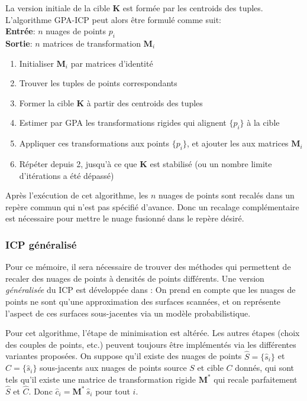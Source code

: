 \documentclass[a4paper,10pt]{scrreprt}
\begin{document}
La version initiale de la cible $\mathbf{K}$ est formée par les centroids des tuples. L'algorithme GPA-ICP peut alors être formulé comme suit: \cite{Told2010} \\
\textbf{Entrée}: $n$ nuages de points ${p_i}$ \\
\textbf{Sortie}: $n$ matrices de transformation ${\mathbf{M}_i}$
\begin{enumerate}
	\item Initialiser ${\mathbf{M}_i}$ par matrices d'identité
	\item Trouver les tuples de points correspondants
	\item Former la cible $\mathbf{K}$ à partir des centroids des tuples
	\item Estimer par GPA les transformations rigides qui alignent $\{p_i\}$ à la cible
	\item Appliquer ces transformations aux points $\{p_i\}$, et ajouter les aux matrices ${\mathbf{M}_i}$
	\item Répéter depuis 2, jusqu'à ce que $\mathbf{K}$ est stabilisé (ou un nombre limite d'itérations a été dépassé)
\end{enumerate} 
Après l'exécution de cet algorithme, les $n$ nuages de points sont recalés dans un repère commun qui n'est pas spécifié d'avance. Donc un recalage complémentaire est nécessaire pour mettre le nuage fusionné dans le repère désiré.

\subsubsection{ICP généralisé}
Pour ce mémoire, il sera nécessaire de trouver des méthodes qui permettent de recaler des nuages de points à densités de points différents. Une version \emph{généralisée} du ICP est développée dans \cite{Sega2009}: On prend en compte que les nuages de points ne sont qu'une approximation des surfaces scannées, et on représente l'aspect de ces surfaces sous-jacentes via un modèle probabilistique.

Pour cet algorithme, l'étape de minimisation est altérée. Les autres étapes (choix des couples de points, etc.) peuvent toujours être implémentés via les différentes variantes proposées. On suppose qu'il existe des nuages de points $\hat{S} = \{ \hat{s}_i \}$ et $\hat{C} = \{ \hat{s}_i \}$ sous-jacents aux nuages de points source $S$ et cible $C$ donnés, qui sont tels qu'il existe une matrice de transformation rigide $\mathbf{M}^*$ qui recale parfaitement $\hat{S}$ et $\hat{C}$. Donc $\hat{c}_i = \mathbf{M}^* \, \hat{s}_i$ pour tout $i$.
\end{document}
